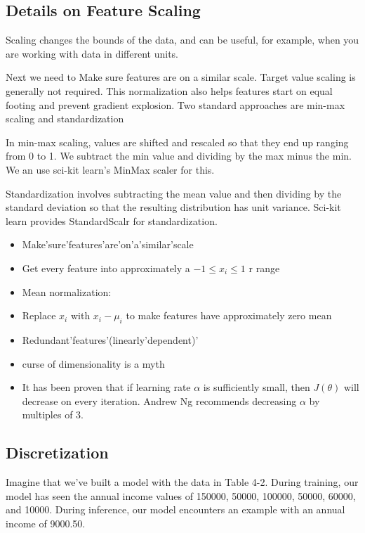\documentclass[openany]{book}
\begin{document}
\subsection{Details on Feature Scaling}


 Scaling changes the bounds of the data, and can be useful, for example, when you are working with data in different units.
 

Next we need to  Make sure features are on a similar scale. Target value scaling is generally not required. This normalization also helps features start on equal footing and prevent gradient explosion.
 Two standard approaches are min-max scaling and standardization

In min-max scaling, values are shifted and rescaled so that they end up ranging from 0 to 1. We subtract the min value and dividing by the max minus the min. We an use sci-kit learn's MinMax scaler for this. 

Standardization involves subtracting the mean value and then dividing by the standard deviation so that the resulting distribution has unit variance. Sci-kit learn provides StandardScalr for standardization. 


\begin{itemize}
    \item Make'sure'features'are'on'a'similar'scale
    \item Get every feature into approximately a $-1 \leq x_{i} \leq 1$ r range
    \item Mean normalization:  
    \item Replace $x_{i}$ with $x_{i}-\mu_{i}$ to make features have approximately zero mean
    \item Redundant'features'(linearly'dependent)'
    \item curse of dimensionality is a myth
    \item It has been proven that if learning rate $\alpha$ is sufficiently small, then $J(\theta)$ will decrease on every iteration. Andrew Ng recommends decreasing $\alpha$ by multiples of $3 .$
    
\end{itemize}

\subsection{Discretization}

Imagine that we’ve built a model with the data in Table 4-2. During training, our model has seen the annual income values of 150000, 50000, 100000, 50000, 60000, and 10000. During inference, our model encounters an example with an annual income of 9000.50. 
\end{document}
